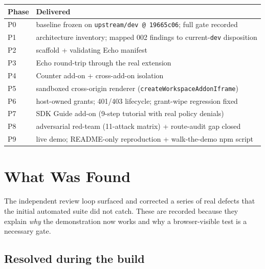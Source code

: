 \documentclass[11pt]{article}
\begin{document}
\begin{center}
\begin{tabular}{@{}p{3.2cm}p{9.0cm}@{}}
\toprule
\textbf{Phase} & \textbf{Delivered} \\
\midrule
P0 & baseline frozen on \texttt{upstream/dev @ 19665c06}; full gate recorded \\
P1 & architecture inventory; mapped 002 findings to current-\texttt{dev} disposition \\
P2 & scaffold + validating Echo manifest \\
P3 & Echo round-trip through the real extension \\
P4 & Counter add-on + cross-add-on isolation \\
P5 & sandboxed cross-origin renderer (\texttt{createWorkspaceAddonIframe}) \\
P6 & host-owned grants; 401/403 lifecycle; grant-wipe regression fixed \\
P7 & SDK Guide add-on (9-step tutorial with real policy denials) \\
P8 & adversarial red-team (11-attack matrix) + route-audit gap closed \\
P9 & live demo; README-only reproduction + walk-the-demo npm script \\
\bottomrule
\end{tabular}
\end{center}

\section{What Was Found}

The independent review loop surfaced and corrected a series of real defects
that the initial automated suite did not catch. These are recorded because they
explain \emph{why} the demonstration now works and why a browser-visible test
is a necessary gate.

\subsection{Resolved during the build}
\end{document}
